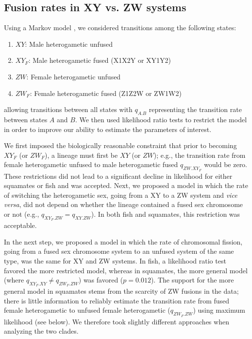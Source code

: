 \subsection{Fusion rates in XY vs. ZW systems}

Using a Markov model \citep{Pagel1994}, we considered transitions among the following states:
\begin{enumerate}
\item $XY$: Male heterogametic unfused
\item $XY_F$: Male heterogametic fused (X1X2Y or XY1Y2)
\item $ZW$: Female heterogametic unfused
\item $ZW_F$: Female heterogametic fused (Z1Z2W or ZW1W2)
\end{enumerate}
allowing transitions between all states with $q_{A.B}$ representing the transition rate between states $A$ and $B$. We then used likelihood ratio tests to restrict the model in order to improve our ability to estimate the parameters of interest. 

We first imposed the biologically reasonable constraint that prior to becoming $XY_F$ (or $ZW_F$), a lineage must first be $XY$ (or $ZW$); e.g., the transition rate from female heterogametic unfused to male heterogametic fused $q_{ZW.XY_F}$ would be zero. These restrictions did not lead to a significant decline in likelihood for either squamates or fish and was accepted. Next, we proposed a model in which the rate of switching the heterogametic sex, going from a XY to a ZW system and \emph{vice versa}, did not depend on whether the lineage contained a fused sex chromosome or not (e.g., $q_{XY_F.ZW} = q_{XY.ZW}$). In both fish and squamates, this restriction was acceptable.

In the next step, we proposed a model in which the rate of chromosomal fission, going from a fused sex chromosome system to an unfused system of the same type, was the same for XY and ZW systems. In fish, a likelihood ratio test favored the more restricted model, whereas in squamates, the more general model (where $q_{XY_F.XY} \neq q_{ZW_F.ZW}$) was favored ($p=\text{0.012}$). The support for the more general model in squamates stems from the scarcity of ZW fusions in the data; there is little information to reliably estimate the transition rate from fused female heterogametic to unfused female heterogametic ($q_{ZW_F.ZW}$) using maximum likelihood (see below). We therefore took slightly different approaches when analyzing the two clades.

